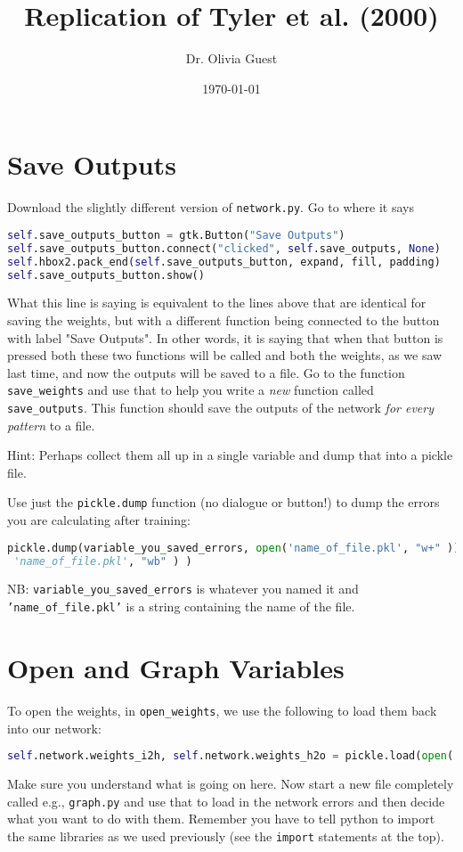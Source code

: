 \documentclass[a4paper,10pt]{article}
\title{Replication of Tyler et al. (2000)}
\author{Dr. Olivia Guest}
\date{\today}
\begin{document}
\maketitle

\section{Save Outputs}
Download the slightly different version of \texttt{network.py}. Go to where it says
\begin{lstlisting}[language=Python]
self.save_outputs_button = gtk.Button("Save Outputs")
self.save_outputs_button.connect("clicked", self.save_outputs, None)
self.hbox2.pack_end(self.save_outputs_button, expand, fill, padding)
self.save_outputs_button.show()
\end{lstlisting}

What this line is saying is equivalent to the lines above that are identical for saving the weights, but with a different function being connected to the button with label "Save Outputs". In other words, it is saying that when that button is pressed both these two functions will be called and both the weights, as we saw last time, and now the outputs will be saved to a file. Go to the function \texttt{save\_weights} and use that to help you write a \emph{new} function called \texttt{save\_outputs}. This function should save the outputs of the network \emph{for every pattern} to a file.

Hint: Perhaps collect them all up in a single variable and dump that into a pickle file.

Use just the \texttt{pickle.dump} function (no dialogue or button!) to dump the errors you are calculating after training:
\begin{lstlisting}[language=Python]
pickle.dump(variable_you_saved_errors, open('name_of_file.pkl', "w+" ))
 'name_of_file.pkl', "wb" ) )
\end{lstlisting}
NB: \texttt{variable\_you\_saved\_errors} is whatever you named it and \texttt{'name\_of\_file.pkl'} is a string containing the name of the file.

\section{Open and Graph Variables}
To open the weights, in \texttt{open\_weights}, we use the following to load them back into our network:
\begin{lstlisting}[language=Python]
self.network.weights_i2h, self.network.weights_h2o = pickle.load(open( dialog.get_filename(), "rb" ) )
\end{lstlisting}
Make sure you understand what is going on here. Now start a new file completely called e.g., \texttt{graph.py} and use that to load in the network errors and then decide what you want to do with them. Remember you have to tell python to import the same libraries as we used previously (see the \texttt{import} statements at the top). 
\end{document}
